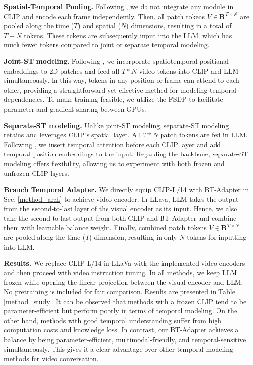 \documentclass{article} \usepackage{iclr2024_conference,times}
\begin{document}
\noindent \textbf{Spatial-Temporal Pooling.}
Following \citet{maaz2023video}, we do not integrate any module in CLIP and encode each frame independently. Then, all patch tokens $V \in \mathbf{R}^{T \times N}$ are pooled along the time ($T$) and spatial ($N$) dimensions, resulting in a total of $T+N$ tokens. These tokens are subsequently input into the LLM, which has much fewer tokens compared to joint or separate temporal modeling.

\noindent \textbf{Joint-ST modeling.} 
Following \citet{xue2022clip}, we incorporate spatiotemporal positional embeddings to 2D patches and feed all $T*N$ video tokens into CLIP and LLM simultaneously. In this way, tokens in any position or frame can attend to each other, providing a straightforward yet effective method for modeling temporal dependencies. To make training feasible, we utilize the FSDP \citep{zhao2023pytorch} to facilitate parameter and gradient sharing between GPUs.

\noindent \textbf{Separate-ST modeling.}
Unlike joint-ST modeling, separate-ST modeling retains and leverages CLIP's spatial layer. All $T*N$ patch tokens are fed in LLM. Following \citet{zeng2023tvtsv2}, we insert temporal attention before each CLIP layer and add temporal position embeddings to the input. Regarding the backbone, separate-ST modeling offers flexibility, allowing us to experiment with both frozen and unfrozen CLIP layers.

\noindent \textbf{Branch Temporal Adapter.}
We directly equip CLIP-L/14 with BT-Adapter in Sec. \ref{method_arch} to achieve video encoder. In LLava, LLM takes the output from the second-to-last layer of the visual encoder as its input. Hence, we also take the second-to-last output from both CLIP and BT-Adapter and combine them with learnable balance weight. Finally, combined patch tokens $V \in \mathbf{R}^{T \times N}$ are pooled along the time ($T$) dimension, resulting in only $N$ tokens for inputting into LLM. 

\noindent \textbf{Results.} We replace CLIP-L/14 in LLaVa with the implemented video encoders and then proceed with video instruction tuning. In all methods, we keep LLM frozen while opening the linear projection between the visual encoder and LLM. No pretraining is included for fair comparison.
Results are presented in Table \ref{method_study}. It can be observed that methods with a frozen CLIP tend to be parameter-efficient but perform poorly in terms of temporal modeling. On the other hand, methods with good temporal understanding suffer from high computation costs and knowledge loss. In contrast, our BT-Adapter achieves a balance by being parameter-efficient, multimodal-friendly, and temporal-sensitive simultaneously. This gives it a clear advantage over other temporal modeling methods for video conversation.
\end{document}
